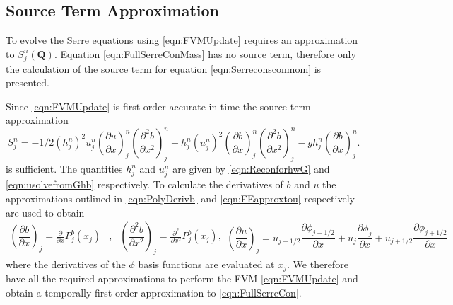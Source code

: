 \documentclass[AMA,STIX1COL]{WileyNJD-v2}
\newcommand{\vecn}[1]{\boldsymbol{#1}}
\begin{document}
\subsection{Source Term Approximation}
To evolve the Serre equations using \eqref{eqn:FVMUpdate} requires an approximation to $S^n_j\left(\vecn{Q}\right)$. Equation \eqref{eqn:FullSerreConMass} has no source term, therefore only the calculation of the source term for equation \eqref{eqn:Serreconsconmom} is presented.

Since \eqref{eqn:FVMUpdate} is first-order accurate in time the source term approximation
\begin{equation}
S^n_j = -1/2\left(h^n_j\right)^2 {u^n_j}\left( \frac{\partial {u}}{\partial x} \right)^n_j \left(\frac{\partial^2 b}{\partial x^2} \right)^n_j  + h^n_j \left(u^n_j\right)^2 \left(\frac{\partial b}{\partial x}\right)^n_j \left(\frac{\partial^2 b}{\partial x^2}\right)^n_j - gh^n_j\left(\frac{\partial b}{\partial x}\right)^n_j.
\label{eqn:SourceTermNaive}
\end{equation}
is sufficient. The quantities $h^n_j$ and $u^n_j$ are given by \eqref{eqn:ReconforhwG} and \eqref{eqn:usolvefromGhb} respectively. To calculate the derivatives of $b$ and $u$ the approximations outlined in \eqref{eqn:PolyDerivb} and \eqref{eqn:FEapproxtou} respectively are used to obtain
\begin{subequations}
\begin{align*}
\left(\dfrac{\partial {b}}{\partial x} \right)_{j} = \frac{\partial }{\partial x}P^b_j(x_{j}) &,& 	
\left(\dfrac{\partial^2 {b}}{\partial x^2} \right)_{j} = \frac{\partial^2 }{\partial x^2}P^b_j(x_{j}),
\end{align*}
\begin{equation*}
\left(\dfrac{\partial {u}}{\partial x} \right)_{j} = u_{j-1/2}\frac{\partial \phi_{j-1/2}}{\partial x} + u_{j}\frac{\partial \phi_{j}}{\partial x} + u_{j+1/2}\frac{\partial \phi_{j+1/2}}{\partial x}
\end{equation*}
\end{subequations}
where the derivatives of the $\phi$ basis functions are evaluated at $x_j$. We therefore have all the required approximations to perform the FVM \eqref{eqn:FVMUpdate} and obtain a temporally first-order approximation to \eqref{eqn:FullSerreCon}.
\end{document}
